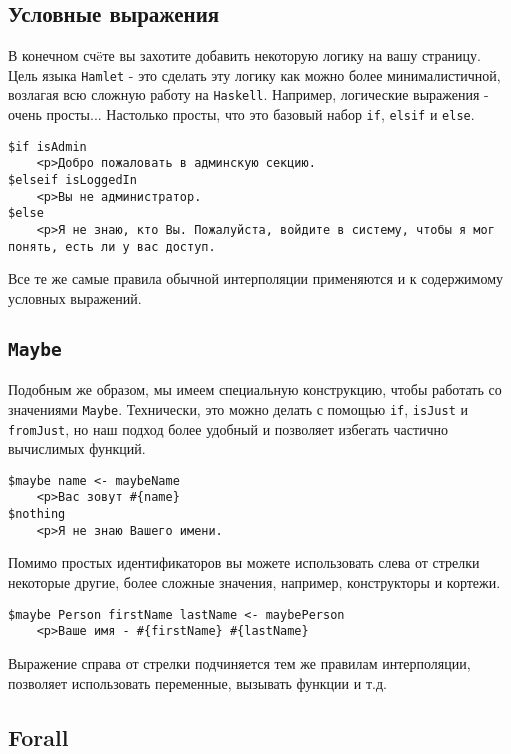 \subsection{Условные выражения}

В конечном счëте вы захотите добавить некоторую логику на вашу страницу. Цель
языка \texttt{Hamlet} - это сделать эту логику как можно более минималистичной, возлагая
всю сложную работу на \texttt{Haskell}. Например, логические выражения - очень просты...
Настолько просты, что это базовый набор \texttt{if}, \texttt{elsif} и
\texttt{else}.

\begin{lstlisting}
$if isAdmin
    <p>Добро пожаловать в админскую секцию.
$elseif isLoggedIn
    <p>Вы не администратор.
$else
    <p>Я не знаю, кто Вы. Пожалуйста, войдите в систему, чтобы я мог понять, есть ли у вас доступ.
\end{lstlisting}

Все те же самые правила обычной интерполяции применяются и к содержимому
условных выражений.

\subsection{\lstinline!Maybe!}

Подобным же образом, мы имеем специальную конструкцию, чтобы работать
со значениями \lstinline!Maybe!. Технически, это можно делать с помощью \texttt{if},
\texttt{isJust} и \texttt{fromJust}, но наш подход более удобный и позволяет
избегать частично вычислимых функций.

\begin{lstlisting}
$maybe name <- maybeName
    <p>Ваc зовут #{name}
$nothing
    <p>Я не знаю Вашего имени.
\end{lstlisting}

Помимо простых идентификаторов вы можете использовать слева от стрелки некоторые другие,
более сложные значения, например, конструкторы и кортежи.

\begin{lstlisting}
$maybe Person firstName lastName <- maybePerson
    <p>Ваше имя - #{firstName} #{lastName}
\end{lstlisting}

Выражение справа от стрелки подчиняется тем же правилам интерполяции,
позволяет использовать переменные, вызывать функции и т.д.

\subsection{Forall}

